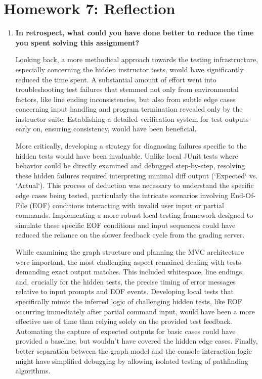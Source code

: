 \documentclass[11pt]{article}
\begin{document}
\section*{Homework 7: Reflection}

\begin{enumerate}
    \item \textbf{In retrospect, what could you have done better to reduce the time you spent solving this assignment?}

    Looking back, a more methodical approach towards the testing infrastructure, especially concerning the hidden instructor tests, would have significantly reduced the time spent. A substantial amount of effort went into troubleshooting test failures that stemmed not only from environmental factors, like line ending inconsistencies, but also from subtle edge cases concerning input handling and program termination revealed only by the instructor suite. Establishing a detailed verification system for test outputs early on, ensuring consistency, would have been beneficial.

    More critically, developing a strategy for diagnosing failures specific to the hidden tests would have been invaluable. Unlike local JUnit tests where behavior could be directly examined and debugged step-by-step, resolving these hidden failures required interpreting minimal diff output (`Expected` vs. `Actual`). This process of deduction was necessary to understand the specific edge cases being tested, particularly the intricate scenarios involving End-Of-File (EOF) conditions interacting with invalid user input or partial commands. Implementing a more robust local testing framework designed to simulate these specific EOF conditions and input sequences could have reduced the reliance on the slower feedback cycle from the grading server.

    While examining the graph structure and planning the MVC architecture were important, the most challenging aspect remained dealing with tests demanding exact output matches. This included whitespace, line endings, and, crucially for the hidden tests, the precise timing of error messages relative to input prompts and EOF events. Developing local tests that specifically mimic the inferred logic of challenging hidden tests, like EOF occurring immediately after partial command input, would have been a more effective use of time than relying solely on the provided test feedback. Automating the capture of expected outputs for basic cases could have provided a baseline, but wouldn't have covered the hidden edge cases. Finally, better separation between the graph model and the console interaction logic might have simplified debugging by allowing isolated testing of pathfinding algorithms.


\end{enumerate}
\end{document}
